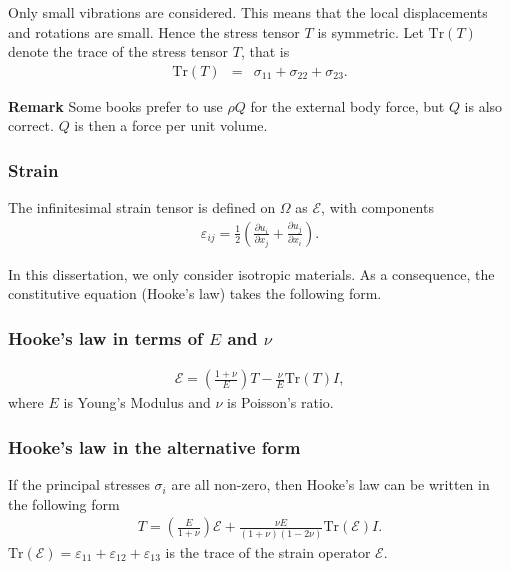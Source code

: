 \documentclass[../../main.tex]{subfiles}ite{VS18}
\begin{document}
Only small vibrations are considered. This means that the local displacements
and rotations are small. Hence the stress tensor $T$ is symmetric. Let
$\textrm{Tr}(T)$\label{sym:TrT} denote the trace of the stress tensor $T$, that is
\begin{eqnarray}
	\textrm{Tr}(T) & = & \sigma_{11} + \sigma_{22} + \sigma_{23}. \label{eq:stress_tensor_t}
\end{eqnarray}

\textbf{Remark} Some books prefer to use $\rho Q$ for the external body force, but $Q$ is also correct. $Q$ is then a force per unit volume.

\subsubsection*{Strain}\label{sssec:3D_Model:Strain}
The infinitesimal strain tensor is defined on $\Omega$ as $\mathcal{E}$\label{sym:mathcalE}, with components
\begin{eqnarray}
	\varepsilon_{ij} = \frac{1}{2}\left( \frac{\partial u_i}{\partial x_j} + \frac{\partial u_j}{\partial x_i} \right). \label{eq:3D_Model:Strain}
\end{eqnarray}\label{sym:varepsilonij}

In this dissertation, we only consider isotropic materials. As a consequence,
the constitutive equation (Hooke's law) takes the following form.

\subsubsection*{Hooke's law in terms of $E$ and $\nu$}\label{sssec:3D_Model:Hooke'sLaw1}\label{sym:E} \label{sym:nu}
\begin{eqnarray}
	\mathcal{E} = \left( \frac{1+\nu}{E} \right)T - \frac{\nu}{E}\textrm{Tr}(T)I,  \label{eq:3D_Model:HL}
\end{eqnarray} where $E$ is Young's Modulus and $\nu$ is Poisson's ratio.

\subsubsection*{Hooke's law in the alternative form}\label{sssec:3D_Model:Hooke'sLaw2}
If the principal stresses $\sigma_i$ are all non-zero, then Hooke's law can be written in the following form
\begin{eqnarray}
	T = \left( \frac{E}{1+\nu} \right)\mathcal{E} + \frac{\nu E}{(1+\nu)(1-2\nu)}\textrm{Tr}(\mathcal{E})I \label{eq:3D_Model:CE}.
\end{eqnarray}
$\textrm{Tr}(\mathcal{E}) = \varepsilon_{11} + \varepsilon_{12} + \varepsilon_{13}$ is the trace of the strain operator $\mathcal{E}$.\\
\end{document}
